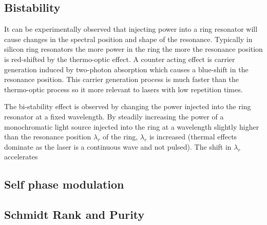 \subsection{Bistability}
It can be experimentally observed that injecting power into a ring resonator will cause changes in the spectral position and shape of the resonance. Typically in silicon ring resonators the more power in the ring the more the resonance position is red-shifted by the thermo-optic effect\cite{almeida_optical_2004-1}. A counter acting effect is carrier generation induced by two-photon absorption \cite{xu_carrier-induced_2006} which causes a blue-shift in the resonance position. This carrier generation process is much faster than the thermo-optic process so it more relevant to lasers with low repetition times. 

The bi-stability effect is observed by changing the power injected into the ring resonator at a fixed wavelength. By steadily increasing the power of a monochromatic light source injected into the ring at a wavelength slightly higher than the resonance position $\lambda_{r}$ of the ring, $\lambda_{r}$ is increased (thermal effects dominate as the laser is a continuous wave and not pulsed). The shift in $\lambda_{r}$ accelerates 
\subsection{Self phase modulation}
\subsection{Schmidt Rank and Purity}
